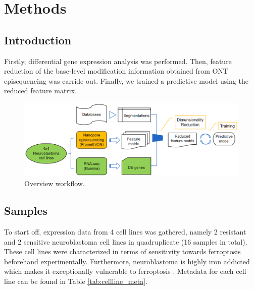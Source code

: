\chapter[Methods]%
{Methods}

\section{Introduction}

Firstly, differential gene expression analysis was performed. Then, feature reduction of the base-level modification information obtained from ONT episequencing was carride out. Finally, we trained a predictive model using the reduced feature matrix.

\begin{figure}[ht]
        \begin{center}
            \includegraphics[width = \textwidth]{Fig/overview_temp.png}
        \end{center}
        \caption{Overview workflow.}
\end{figure}

\section{Samples}

To start off, expression data from 4 cell lines was gathered, namely 2 resistant and 2 sensitive neuroblastoma cell lines in quadruplicate (16 samples in total). These cell lines were characterized in terms of sensitivity towards ferroptosis beforehand experimentally. Furthermore, neuroblastoma is highly iron addicted which makes it exceptionally vulnerable to ferroptosis \citep{nb_iron}. Metadata for each cell line can be found in Table \ref{tab:cellline_meta}.

